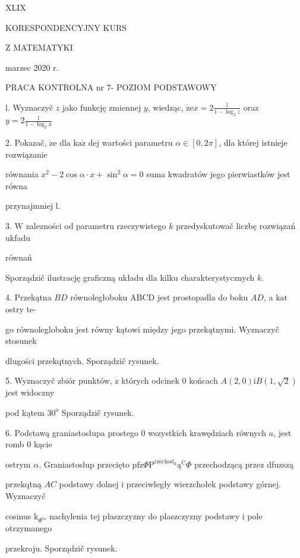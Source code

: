 \documentclass[a4paper,12pt]{article}
\begin{document}
XLIX

KORESPONDENCYJNY KURS

Z MATEMATYKI

marzec 2020 r.

PRACA KONTROLNA nr 7- POZIOM PODSTAWOWY

l. Wyznaczyč $z$ jako funkcję zmiennej $y$, wiedząc, $\displaystyle \dot{\mathrm{z}}\mathrm{e}x=2\frac{\mathrm{l}}{1-\log_{2}z}$ oraz $y=2\displaystyle \frac{\mathrm{l}}{1-\log_{2}x}$

2. Pokazač, $\dot{\mathrm{z}}\mathrm{e}$ dla $\mathrm{k}\mathrm{a}\dot{\mathrm{z}}$ dej wartości parametru $\alpha \in [0,2\pi]$, dla której istnieje rozwiązanie

równania $x^{2}-2\cos\alpha\cdot x+\sin^{2}\alpha= 0$ suma kwadratów jego pierwiastków jest równa

przynajmniej l.

3. $\mathrm{W}$ zalezności od parametru rzeczywistego $k$ przedyskutowač liczbę rozwiązań ukfadu

równań 

Sporządzič ilustrację graficzną układu dla kilku charakterystycznych $k.$

4. Przekątna $BD$ równoległoboku ABCD jest prostopadla do boku $AD$, a $\mathrm{k}\mathrm{a}\mathrm{t}$ ostry te-

go równolegloboku jest równy kątowi między jego przekątnymi. Wyznaczyč stosunek

dlugości przekqtnych. Sporządzič rysunek.

5. Wyznaczyč zbiór punktów, $\mathrm{z}$ których odcinek $0$ końcach $A(2,0)\mathrm{i}B(1,\sqrt{2})$ jest widoczny

pod kątem $30^{\mathrm{o}}$ Sporządzič rysunek.

6. Podstawą graniastosłupa prostego $0$ wszystkich krawędziach równych $a$, jest romb $0$ kącie

ostrym $\alpha$. Graniastoslup przecięto $\mathrm{p}\mathrm{f}\mathrm{z}\Phi \mathrm{P}^{\mathrm{r}\mathrm{z}\mathrm{e}\mathrm{c}\mathrm{h}\mathrm{o}\mathrm{d}_{\mathrm{Z}}}\text{ą}^{\mathrm{C}}\Phi$ przechodzącą przez dfuzszą

przekqtną $AC$ podstawy dolnej $\mathrm{i}$ przeciwległy wierzchołek podstawy górnej. Wyznaczyč

cosinus $\mathrm{k}_{\Phi^{\mathrm{t}\mathrm{a}}}$ nachylenia tej płaszczyzny do plaszczyzny podstawy $\mathrm{i}$ pole otrzymanego

przekroju. Sporządzič rysunek.
\end{document}
